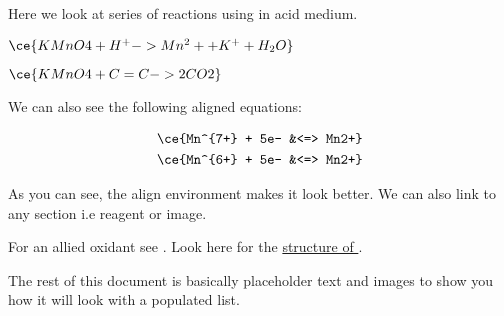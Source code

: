 Here we look at series of reactions using  in acid medium.


$ \ce{KMnO4 + H^+ -> Mn^2+ + K^+ + H_2O} $

$ \ce{KMnO4 + C=C -> 2CO2} $

We can also see the following aligned equations:

\begin{align}
	\ce{Mn^{7+} + 5e- &<=> Mn2+} \\
	\ce{Mn^{6+} + 5e- &<=> Mn2+}
\end{align}

As you can see, the align environment makes it look better.
We can also link to any section i.e reagent or image.

For an allied oxidant see \hyperref[sec:k2cr2o7]{}. 
Look here for the \hyperref[fig:k2cr2o7]{structure of }.

The rest of this document is basically placeholder text and
images to show you how it will look with a populated list.